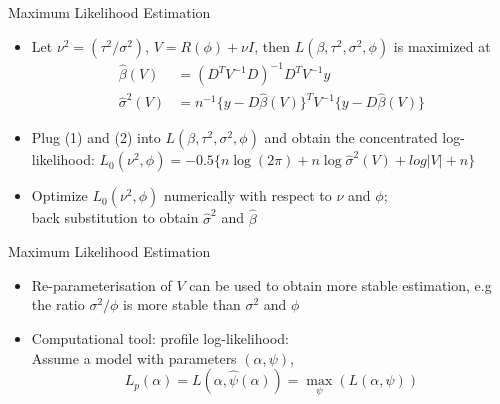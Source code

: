 \documentclass{beamer}
\begin{document}
\begin{frame}{Maximum Likelihood Estimation}

	\begin{itemize}
	   \item Let $\nu^2 = ({\tau^2} /{\sigma^2})$, $V = R(\phi) + \nu I$, then $L(\beta, \tau^2, \sigma^2, \phi)$ is maximized at 
		\begin{align}
		\hat{\beta}(V) &= (D^T V^{-1}D)^{-1}D^TV^{-1}y \\
		\hat{\sigma}^2(V) &= n^{-1} \{y - D\hat{\beta}(V)\}^T V^{-1}\{y - D\hat{\beta}(V)\} 
		\end{align}
		\item Plug (1) and (2) into $L(\beta, \tau^2, \sigma^2, \phi)$ and obtain  the {\color{blue}concentrated log-likelihood}: 
		$L_0(\nu^2, \phi) = -0.5 \{n \log (2 \pi) + n \log \hat{\sigma}^2(V) +  log |V|+ n \}$
		\item Optimize $L_0(\nu^2, \phi)$ numerically with respect to $\nu$ and $\phi$; \\ back substitution to obtain $\hat{\sigma}^2$ and $\hat{\beta}$
	\end{itemize}
\end{frame}


\begin{frame}{Maximum Likelihood Estimation}

	\begin{itemize}
\item Re-parameterisation of $V$ can be used to obtain more stable estimation, e.g  the ratio $\sigma^2 / \phi$ is more stable than $\sigma^2$ and $\phi$
		\item  Computational tool:  {\color{blue}profile log-likelihood}: \\
		Assume a model with parameters $(\alpha, \psi)$, 
		$$L_p(\alpha) = L(\alpha, \hat{\psi}(\alpha))  = \max_{\psi}(L(\alpha, \psi))$$  %
	\end{itemize}
\end{frame}
\end{document}
